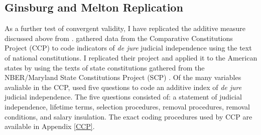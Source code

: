 \documentclass[Johnson MA Draft2.tex]{subfiles}
\begin{document}
\subsection*{Ginsburg and Melton Replication}
As a further test of convergent validity, I have replicated the additive measure discussed above from \citet{Melton2014}.  \citet{Melton2014} gathered data from the Comparative Constitutions Project (CCP) to code indicators of \textit{de jure} judicial independence using the text of national constitutions.  I replicated their project and applied it to the American states by using the texts of state constitutions gathered from the NBER/Maryland State Constitutions Project (SCP) \citep{Wallisnber}.  Of the many variables avaliable in the CCP, \citet{Melton2014} used five questions to code an additive index of \textit{de jure} judicial independence.  The five questions consisted of: a statement of judicial independence, lifetime terms, selection procedures, removal procedures, removal conditions, and salary insulation.  The exact coding procedures used by CCP are available in Appendix \ref{CCP}.
\end{document}
